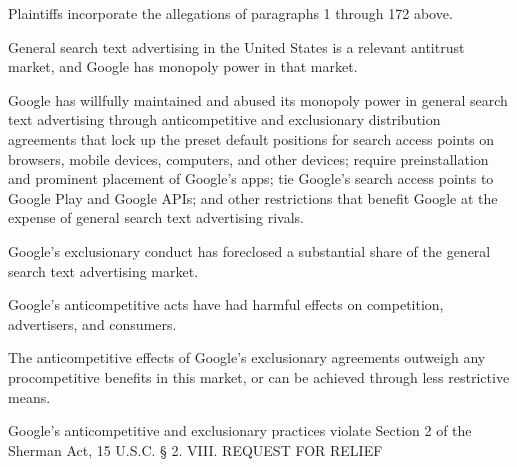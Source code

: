 \documentclass[11pt,b5paper]{scrartcl}
\begin{document}

Plaintiffs incorporate the allegations of paragraphs 1 through 172 above.


General search text advertising in the United States is a relevant antitrust market,
and Google has monopoly power in that market.


Google has willfully maintained and abused its monopoly power in general search
text advertising through anticompetitive and exclusionary distribution agreements that lock up
the preset default positions for search access points on browsers, mobile devices, computers, and
other devices; require preinstallation and prominent placement of Google’s apps; tie Google’s
search access points to Google Play and Google APIs; and other restrictions that benefit Google
at the expense of general search text advertising rivals.


Google’s exclusionary conduct has foreclosed a substantial share of the general
search text advertising market.


Google’s anticompetitive acts have had harmful effects on competition,
advertisers, and consumers.


The anticompetitive effects of Google’s exclusionary agreements outweigh any
procompetitive benefits in this market, or can be achieved through less restrictive means.


Google’s anticompetitive and exclusionary practices violate Section 2 of the
Sherman Act, 15 U.S.C. § 2.
VIII. REQUEST FOR RELIEF

\end{document}
